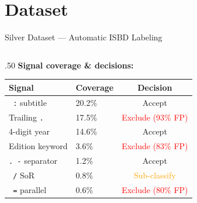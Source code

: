 \documentclass[xcolor,aspectratio=169,compress]{beamer}
\begin{document}
\section{Dataset}

\begin{frame}{Silver Dataset --- Automatic ISBD Labeling}
  \small
  \begin{columns}
    \begin{column}{.50\textwidth}
      \textbf{Signal coverage \& decisions:}
      \smallskip
      \begin{tabular}{llc}
        \toprule
        Signal & Coverage & Decision \\
        \midrule
        \texttt{ :} subtitle      & 20.2\% & \textcolor{green!60!black}{Accept} \\
        Trailing \texttt{.}       & 17.5\% & \textcolor{red}{Exclude (93\% FP)} \\
        4-digit year              & 14.6\% & \textcolor{green!60!black}{Accept} \\
        Edition keyword           & 3.6\%  & \textcolor{red}{Exclude (83\% FP)} \\
        \texttt{. -} separator    & 1.2\%  & \textcolor{green!60!black}{Accept} \\
        \texttt{ /} SoR           & 0.8\%  & \textcolor{orange}{Sub-classify} \\
        \texttt{ =} parallel      & 0.6\%  & \textcolor{red}{Exclude (80\% FP)} \\
        \bottomrule
      \end{tabular}
      \smallskip


\end{column}
\end{columns}
\end{frame}
\end{document}
